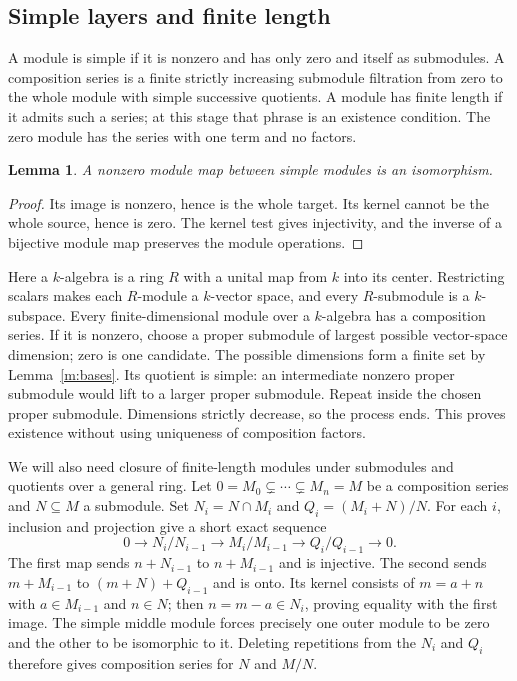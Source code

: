 \documentclass[11pt]{article}
\newtheorem{lemma}[theorem]{Lemma}
\theoremstyle{definition}
\theoremstyle{remark}\newtheorem{remark}[theorem]{Remark}
\begin{document}
\subsection{Simple layers and finite length}
\label{m:length-foundations}

A module is simple if it is nonzero and has only zero and itself as
submodules. A composition series is a finite strictly increasing
submodule filtration from zero to the whole module with simple
successive quotients. A module has finite length if it admits such
a series; at this stage that phrase is an existence condition.
The zero module has the series with one term and no factors.

\begin{lemma}\label{m:simple-map}
A nonzero module map between simple modules is an isomorphism.
\end{lemma}
\begin{proof}
Its image is nonzero, hence is the whole target. Its kernel cannot be
the whole source, hence is zero. The kernel test gives injectivity,
and the inverse of a bijective module map preserves the module operations.
\end{proof}

Here a $k$-algebra is a ring $R$ with a unital map from $k$ into its
center. Restricting scalars makes each $R$-module a $k$-vector space,
and every $R$-submodule is a $k$-subspace.
Every finite-dimensional module over a $k$-algebra has a composition
series. If it is nonzero, choose a proper submodule of largest possible
vector-space dimension; zero is one candidate. The possible dimensions
form a finite set by Lemma~\ref{m:bases}. Its quotient is simple:
an intermediate nonzero proper submodule would lift to a larger proper
submodule. Repeat inside the chosen proper submodule. Dimensions
strictly decrease, so the process ends. This proves existence without
using uniqueness of composition factors.

We will also need closure of finite-length modules under submodules
and quotients over a general ring. Let
$0=M_0\subsetneq\cdots\subsetneq M_n=M$ be a composition series
and $N\subseteq M$ a submodule. Set
$N_i=N\cap M_i$ and $Q_i=(M_i+N)/N$.
For each $i$, inclusion and projection give a short exact sequence
\begin{equation}\label{m:layer-exact}
0\longrightarrow N_i/N_{i-1}\longrightarrow M_i/M_{i-1}
\longrightarrow Q_i/Q_{i-1}\longrightarrow0.
\end{equation}
The first map sends $n+N_{i-1}$ to $n+M_{i-1}$ and is injective.
The second sends $m+M_{i-1}$ to $(m+N)+Q_{i-1}$ and is onto.
Its kernel consists of $m=a+n$ with $a\in M_{i-1}$ and $n\in N$;
then $n=m-a\in N_i$, proving equality with the first image.
The simple middle module forces precisely one outer module to be zero
and the other to be isomorphic to it. Deleting repetitions from the
$N_i$ and $Q_i$ therefore gives composition series for $N$ and $M/N$.
\end{document}
